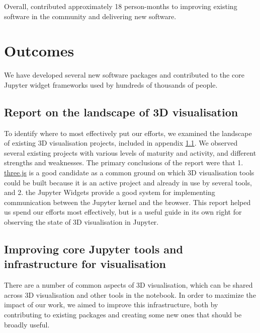 \documentclass{deliverablereport}
\begin{document}

Overall, \ODK contributed approximately 18 person-months to improving existing software in the community and delivering new software.


\section{Outcomes}

We have developed several new software packages and contributed to the core Jupyter widget frameworks used by hundreds of thousands of people.

\subsection{Report on the landscape of 3D visualisation}\label{landscape}

To identify where to most effectively put our efforts,
we examined the landscape of existing 3D visualisation projects,
included in appendix \ref{landscape}.
We observed several existing projects with various levels of maturity and activity, and different strengths and weaknesses.
The primary conclusions of the report were that 1. \href{https://threejs.org}{three.js} is a good candidate as a common ground on which 3D visualisation tools could be built because it is an active project and already in use by several tools, and 2. the Jupyter Widgets provide a good system for implementing communication between the Jupyter kernel and the browser.
This report helped us spend our efforts most effectively,
but is a useful guide in its own right for observing the state
of 3D visualisation in Jupyter.


\subsection{Improving core Jupyter tools and infrastructure for visualisation}\label{improving-core}

There are a number of common aspects of 3D visualisation,
which can be shared across 3D visualisation and other tools
in the notebook.
In order to maximize the impact of our work,
we aimed to improve this infrastructure,
both by contributing to existing packages and creating some new ones
that should be broadly useful.
\end{document}
